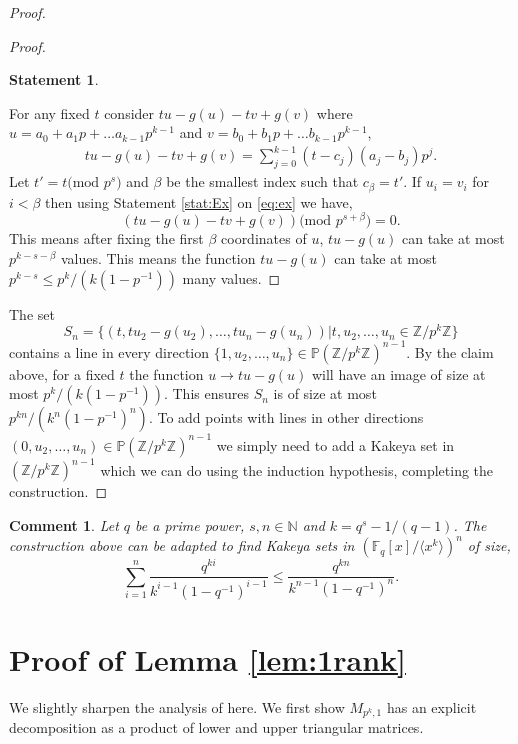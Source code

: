 \documentclass[11pt]{article}
\numberwithin{equation}{section}
\newtheorem{stat}[thm]{Statement}
\newtheorem{comm}[thm]{Comment}
\def\F{{\mathbb{F}}}
\def\Z{{\mathbb{Z}}}
\def\N{{\mathbb{N}}}
\def\P{{\mathbb{P}}}
\begin{document}
\begin{proof}
\begin{proof}
\begin{stat}
\end{stat}

For any fixed $t$ consider $tu-g(u)-tv+g(v)$ where $u=a_0+a_1p+\hdots a_{k-1}p^{k-1}$ and $v=b_0+b_1p+\hdots b_{k-1}p^{k-1}$,
\begin{align}\label{eq:ex}
    tu-g(u)-tv+g(v)=\sum\limits_{j=0}^{k-1} (t-c_j)(a_j-b_j)p^j.
\end{align}
Let $t'=t\text{(mod }p^s\text{)}$ and $\beta$ be the smallest index such that $c_\beta=t'$. If $u_i=v_i$ for $i< \beta$ then using Statement \ref{stat:Ex} on \eqref{eq:ex} we have,
$$\left(tu-g(u)-tv+g(v) \right)\text{(mod }p^{s+\beta}\text{)}=0.$$
This means after fixing the first $\beta$ coordinates of $u$, $tu-g(u)$ can take at most $p^{k-s-\beta}$ values. This means the function $tu-g(u)$ can take at most $p^{k-s}\le p^k/(k(1-p^{-1}))$ many values.
\end{proof}
 The set 
$$S_n=\{(t,tu_2-g(u_2),\hdots,tu_n-g(u_n))|t,u_2,\hdots,u_n\in \Z/p^k\Z\}$$
contains a line in every direction $\{1,u_2,\hdots,u_n\}\in \P (\Z/p^k\Z)^{n-1}$. By the claim above, for a fixed $t$ the function $u\rightarrow tu-g(u)$ will have an image of size at most $p^k/(k(1-p^{-1}))$. This ensures $S_n$ is of size at most $p^{kn}/(k^n(1-p^{-1})^n)$. To add points with lines in other directions $(0,u_2,\hdots,u_n)\in \P (\Z/p^k\Z)^{n-1}$ we simply need to add a Kakeya set in $(\Z/p^k\Z)^{n-1}$ which we can do using the induction hypothesis, completing the construction.
\end{proof}
\begin{comm}
Let $q$ be a prime power, $s,n\in \N$ and $k=q^s-1/(q-1)$. The construction above can be adapted to find Kakeya sets in $(\F_q[x]/\langle x^k\rangle)^n$ of size,
$$\sum\limits_{i=1}^n \frac{q^{ki}}{k^{i-1}(1-q^{-1})^{i-1}}\le \frac{q^{kn}}{k^{n-1}(1-q^{-1})^{n}}.$$
\end{comm}









\appendix
\section{Proof of Lemma \ref{lem:1rank}}\label{ap:rk}

We slightly sharpen the analysis of \cite{arsovski2021padic} here. We first show $M_{p^k,1}$ has an explicit decomposition as a product of lower and upper triangular matrices.
\end{document}
